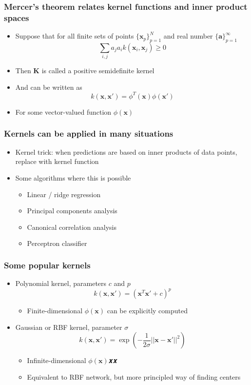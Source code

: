 \documentclass[12pt,notes,mathserif]{beamer}
\begin{document}
\begin{frame}[c]
\frametitle{Mercer's theorem relates kernel functions and inner product spaces}
\begin{itemize}
\item Suppose that for all finite sets of points $\{\mathbf{x}_p\}_{p=1}^N$ and real number $\{\mathbf{a}\}_{p=1}^{\infty}$
\[
\sum_{i,j}a_ja_ik(\mathbf{x}_i,\mathbf{x}_j) \ge 0
\]
\item Then $\mathbf{K}$ is called a positive semidefinite kernel
\item And can be written as
\[
k(\mathbf{x},\mathbf{x}')=\phi^T(\mathbf{x})\phi(\mathbf{x}')
\]
\item For some vector-valued function $\phi(\mathbf{x})$
\end{itemize}
\end{frame}



\begin{frame}[c]
\frametitle{Kernels can be applied in many situations}
\begin{itemize}
\item Kernel trick: when predictions are based on inner products of data points, replace with kernel function
\item Some algorithms where this is possible
\begin{itemize}
\item Linear / ridge regression
\item Principal components analysis
\item Canonical correlation analysis
\item Perceptron classifier
\end{itemize}
\end{itemize}
\end{frame}


\begin{frame}[c]
\frametitle{Some popular kernels}
\begin{itemize}
\item Polynomial kernel, parameters $c$ and $p$
\[
k(\mathbf{x},\mathbf{x}')=(\mathbf{x}^T\mathbf{x}'+c)^p
\]
\begin{itemize}
\item Finite-dimensional $\phi(\mathbf{x})$ can be explicitly computed
\end{itemize}
\item Gaussian or RBF kernel, parameter $\sigma$
\[
k(\mathbf{x},\mathbf{x}')=\exp\left(-\dfrac{1}{2\sigma}||\mathbf{x}-\mathbf{x}'||^2\right)
\]
\begin{itemize}
\item Infinite-dimensional $\phi(\mathbf{x})$𝒙𝒙
\item Equivalent to RBF network, but more principled way of finding centers
\end{itemize}
\end{itemize}
\end{frame}
\end{document}
